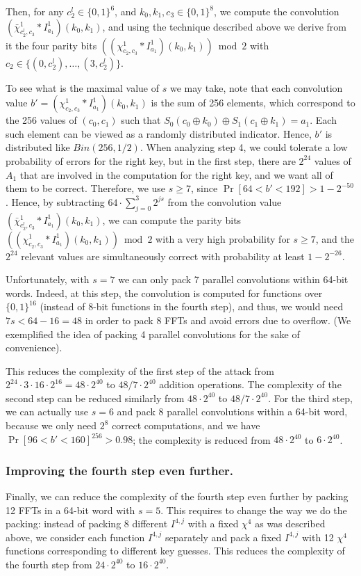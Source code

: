 Then, for any $c_2^l \in \{0,1\}^6$, and $k_0,k_1,c_3 \in \{0,1\}^8$, we compute the convolution
$(\bar{\chi}^1_{c_2^l,c_3} * I^1_{a_1})(k_0,k_1)$, and using the technique described above we derive from it the four parity bits $((\chi^1_{c_2,c_3} * I^1_{a_1})(k_0,k_1)) \bmod 2$ with $c_2 \in \{(0, c_2^l), \ldots, (3,c_2^l)\}$.

To see what is the maximal value of $s$ we may take, note that each convolution value $b'=(\chi^1_{c_2,c_3} * I^1_{a_1})(k_0,k_1)$ is the sum of 256 elements, which correspond to the 256 values of $(c_0,c_1)$ such that $S_0(c_0 \oplus k_0) \oplus S_1(c_1\oplus k_1)=a_1$. Each such element can be viewed as a randomly distributed indicator. Hence, $b'$ is distributed like $Bin(256,1/2)$.  When analyzing step 4, we could tolerate a low probability of errors for the right key, but in the first step, there are $2^{24}$ values of $A_1$ that are involved in the computation for the right key, and we want all of them to be correct.  Therefore, we use $s \ge 7$, since $\Pr[64<b'<192]>1-2^{-50}$.
Hence, by subtracting $64 \cdot \sum_{j=0}^3 2^{js}$ from the convolution value $(\bar{\chi}^1_{c_2^l,c_3} * I^1_{a_1})(k_0,k_1)$, we can compute the parity bits $\left((\chi^1_{c_2,c_3} * I^1_{a_1})(k_0,k_1)\right) \bmod 2$ with a very high probability for $s \geq 7$, and the $2^{24}$ relevant values are simultaneously correct with probability at least $1-2^{-26}$.

Unfortunately, with $s = 7$ we can only pack 7 parallel convolutions within 64-bit words.  Indeed, at this step, the convolution is computed for functions over $\{0,1\}^{16}$ (instead of 8-bit functions in the fourth step), and thus, we would need $7s<64-16=48$ in order to pack 8 FFTs and avoid errors due to overflow. 
(We exemplified the idea of packing 4 parallel convolutions for the sake of convenience).

This reduces the complexity of the first step of the attack from $2^{24} \cdot 3 \cdot 16 \cdot 2^{16} = 48 \cdot 2^{40}$ to $48/7 \cdot 2^{40}$ addition operations. The complexity of the second step can be reduced similarly from $48 \cdot 2^{40}$ to $48/7 \cdot 2^{40}$.  For the third step, we can actually use $s=6$ and pack 8 parallel convolutions within a 64-bit word, because we only need $2^8$ correct computations, and we have $\Pr[96<b'<160]^{256}>0.98$; the complexity is reduced from $48 \cdot 2^{40}$ to $6 \cdot 2^{40}$.

\subsubsection{Improving the fourth step even further.} Finally, we can reduce the complexity of the fourth step even further by packing 12 FFTs in a 64-bit word with $s=5$. This requires to change the way we do the packing: instead of packing 8 different $I^{4,j}$ with a fixed $\chi^4$ as was described above, we consider each function $I^{4,j}$ separately and pack a fixed $I^{4,j}$ with 12 $\chi^4$ functions corresponding to different key guesses. This reduces the complexity of the fourth step from $24 \cdot 2^{40}$ to $16 \cdot 2^{40}$.

